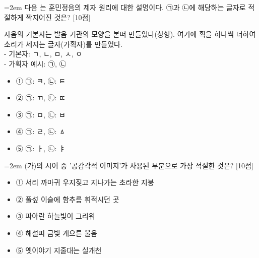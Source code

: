 \documentclass[11pt,a4paper]{article}
\newcommand{\qnum}[1]{%
  \tikz[baseline=(num.base)]{%
    \node[circle, fill=numCircle, text=white, inner sep=0pt,
          minimum size=18pt, font=\small\bfseries] (num) {#1};%
  }%
}
\newcommand{\pts}[1]{%
  \hfill\textcolor{ptsBadge}{[#1점]}%
}
\begin{document}
\vspace{4mm}
\begin{minipage}{\columnwidth}
{\hangindent=2em
\qnum{21}\enspace 다음 는 훈민정음의 제자 원리에 대한 설명이다. ㉠과 ㉡에 해당하는 글자로 적절하게 짝지어진 것은? \pts{10}
\par}

\vspace{3mm}
\begin{tcolorbox}[bogi]
자음의 기본자는 발음 기관의 모양을 본떠 만들었다(상형). 여기에 획을 하나씩 더하여 소리가 세지는 글자(가획자)를 만들었다. \\{}
- 기본자: ㄱ, ㄴ, ㅁ, ㅅ, ㅇ \\{}
- 가획자 예시: ㉠, ㉡
\end{tcolorbox}
\vspace{3mm}
\begin{itemize}[leftmargin=2.5em, labelsep=0.3em, label={}, itemsep=4pt, parsep=1pt, topsep=0pt]
  \item ① ㉠: ㅋ, ㉡: ㅌ
  \item ② ㉠: ㄲ, ㉡: ㄸ
  \item ③ ㉠: ㅁ, ㉡: ㅂ
  \item ④ ㉠: ㄹ, ㉡: ㅿ
  \item ⑤ ㉠: ㅏ, ㉡: ㅑ
\end{itemize}
\end{minipage}
\vspace{4mm}

\vspace{4mm}
\begin{minipage}{\columnwidth}
{\hangindent=2em
\qnum{22}\enspace (가)의 시어 중 '공감각적 이미지'가 사용된 부분으로 가장 적절한 것은? \pts{10}
\par}

\vspace{3mm}
\begin{itemize}[leftmargin=2.5em, labelsep=0.3em, label={}, itemsep=4pt, parsep=1pt, topsep=0pt]
  \item ① 서리 까마귀 우지짖고 지나가는 초라한 지붕
  \item ② 풀섶 이슬에 함추름 휘적시던 곳
  \item ③ 파아란 하늘빛이 그리워
  \item ④ 해설피 금빛 게으른 울음
  \item ⑤ 옛이야기 지줄대는 실개천
\end{itemize}
\end{minipage}
\vspace{4mm}
\end{document}
